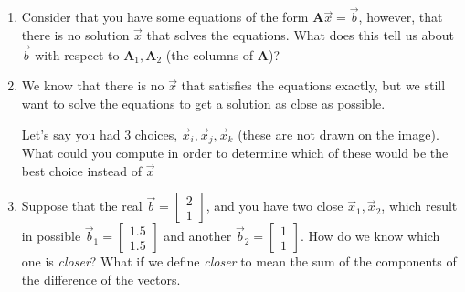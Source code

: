 \\ \\
\begin{enumerate}

\begin{figure}[H]
    \centering
    \texttt{[image: ../ls.png]}
\end{figure}

\item{

Consider that you have some equations of the form $\mathbf{A}\vec{x} = \vec{b}$, however, that there is no solution $\vec{x}$ that solves the equations. What does this tell us about $\vec{b}$ with respect to $\mathbf{A}_1, \mathbf{A}_2$ (the columns of $\mathbf{A}$)?
}


\item{
We know that there is no $\vec{x}$ that satisfies the equations exactly, but we still want to solve the equations to get a solution as close as possible.

Let's say you had 3 choices, $\vec{x}_i, \vec{x}_j, \vec{x}_k$ (these are not drawn on the image). What could you compute in order to determine which of these would be the best choice instead of $\vec{x}$
}



\item{Suppose that the real $\vec{b} = \begin{bmatrix} 2 \\ 1 \end{bmatrix}$, and you have two close $\vec{x}_1, \vec{x}_2$, which result in possible $\vec{b}_1 = \begin{bmatrix} 1.5 \\ 1.5 \end{bmatrix}$ and another $\vec{b}_2 = \begin{bmatrix} 1 \\ 1 \end{bmatrix}$. How do we know which one is \textit{closer}? What if we define \textit{closer} to mean the sum of the components of the difference of the vectors.}


\end{enumerate}
